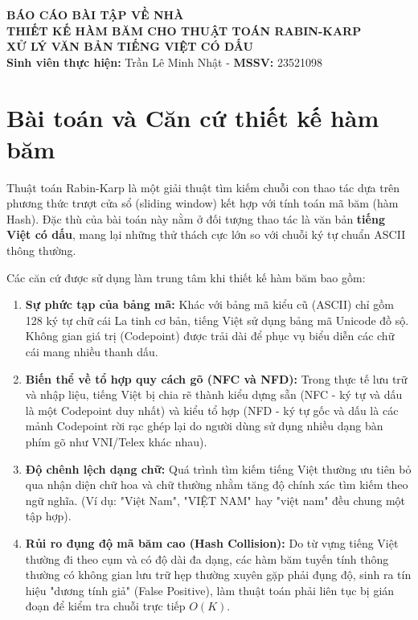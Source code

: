 \documentclass[a4paper,12pt]{article}
\begin{document}
\begin{center}
    \LARGE \textbf{BÁO CÁO BÀI TẬP VỀ NHÀ} \\[0.5cm]
    \Large \textbf{THIẾT KẾ HÀM BĂM CHO THUẬT TOÁN RABIN-KARP} \\[0.2cm]
    \Large \textbf{XỬ LÝ VĂN BẢN TIẾNG VIỆT CÓ DẤU} \\[0.5cm]
    \normalsize \textbf{Sinh viên thực hiện:} Trần Lê Minh Nhật - \textbf{MSSV:} 23521098
\end{center}
\vspace{1cm}

\section{Bài toán và Căn cứ thiết kế hàm băm}

Thuật toán Rabin-Karp là một giải thuật tìm kiếm chuỗi con thao tác dựa trên phương thức trượt cửa sổ (sliding window) kết hợp với tính toán mã băm (hàm Hash). Đặc thù của bài toán này nằm ở đối tượng thao tác là văn bản \textbf{tiếng Việt có dấu}, mang lại những thử thách cực lớn so với chuỗi ký tự chuẩn ASCII thông thường. 

Các căn cứ được sử dụng làm trung tâm khi thiết kế hàm băm bao gồm:
\begin{enumerate}
    \item \textbf{Sự phức tạp của bảng mã:} Khác với bảng mã kiểu cũ (ASCII) chỉ gồm 128 ký tự chữ cái La tinh cơ bản, tiếng Việt sử dụng bảng mã Unicode đồ sộ. Không gian giá trị (Codepoint) được trải dài để phục vụ biểu diễn các chữ cái mang nhiều thanh dấu.
    \item \textbf{Biến thể về tổ hợp quy cách gõ (NFC và NFD):} Trong thực tế lưu trữ và nhập liệu, tiếng Việt bị chia rẽ thành kiểu dựng sẵn (NFC - ký tự và dấu là một Codepoint duy nhất) và kiểu tổ hợp (NFD - ký tự gốc và dấu là các mảnh Codepoint rời rạc ghép lại do người dùng sử dụng nhiều dạng bàn phím gõ như VNI/Telex khác nhau). 
    \item \textbf{Độ chênh lệch dạng chữ:} Quá trình tìm kiếm tiếng Việt thường ưu tiên bỏ qua nhận diện chữ hoa và chữ thường nhằm tăng độ chính xác tìm kiếm theo ngữ nghĩa. (Ví dụ: "Việt Nam", "VIỆT NAM" hay "việt nam" đều chung một tập hợp).
    \item \textbf{Rủi ro đụng độ mã băm cao (Hash Collision):} Do từ vựng tiếng Việt thường đi theo cụm và có độ dài đa dạng, các hàm băm tuyến tính thông thường có không gian lưu trữ hẹp thường xuyên gặp phải đụng độ, sinh ra tín hiệu "dương tính giả" (False Positive), làm thuật toán phải liên tục bị gián đoạn để kiểm tra chuỗi trực tiếp $O(K)$.
\end{enumerate}
\end{document}
